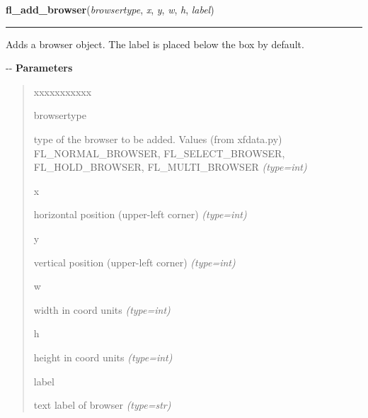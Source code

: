     \vspace{0.5ex}

\hspace{.8\funcindent}\begin{boxedminipage}{\funcwidth}

    \raggedright \textbf{fl\_add\_browser}(\textit{browsertype}, \textit{x}, \textit{y}, \textit{w}, \textit{h}, \textit{label})

    \vspace{-1.5ex}

    \rule{\textwidth}{0.5\fboxrule}
\setlength{\parskip}{2ex}

Adds a browser object. The label is placed below the box by default.

-{}-
\setlength{\parskip}{1ex}
      \textbf{Parameters}
      \vspace{-1ex}

      \begin{quote}
        \begin{Ventry}{xxxxxxxxxxx}

          \item[browsertype]


type of the browser to be added. Values (from xfdata.py)
FL\_NORMAL\_BROWSER, FL\_SELECT\_BROWSER, FL\_HOLD\_BROWSER, FL\_MULTI\_BROWSER
            {\it (type=int)}

          \item[x]


horizontal position (upper-left corner)
            {\it (type=int)}

          \item[y]


vertical position (upper-left corner)
            {\it (type=int)}

          \item[w]


width in coord units
            {\it (type=int)}

          \item[h]


height in coord units
            {\it (type=int)}

          \item[label]


text label of browser
            {\it (type=str)}

        \end{Ventry}

      \end{quote}


\end{boxedminipage}
